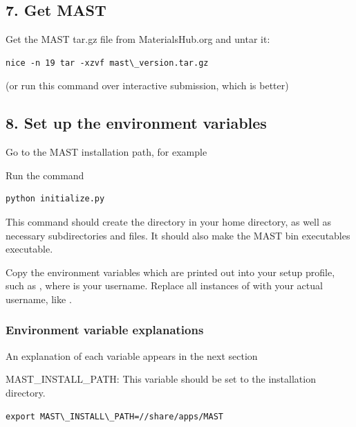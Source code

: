 \documentclass[letterpaper,10pt,english]{sphinxmanual}
\begin{document}
\subsection{7. Get MAST}
\label{1_0_installation:get-mast}
Get the MAST tar.gz file from MaterialsHub.org and untar it:

\begin{Verbatim}[commandchars=\\\{\}]
nice -n 19 tar -xzvf mast\_version.tar.gz
\end{Verbatim}

(or run this command over interactive submission, which is better)


\subsection{8. Set up the environment variables}
\label{1_0_installation:set-up-the-environment-variables}
Go to the MAST installation path, for example 

Run the command

\begin{Verbatim}[commandchars=\\\{\}]
python initialize.py
\end{Verbatim}

This command should create the  directory in your home directory, as well as necessary subdirectories and files.
It should also make the MAST bin executables executable.

Copy the environment variables which are printed out into your setup profile, such as , where  is your username. Replace all instances of  with your actual username, like .


\subsubsection{Environment variable explanations}
\label{1_0_installation:environment-variable-explanations}
An explanation of each variable appears in the next section

MAST\_INSTALL\_PATH: This variable should be set to the installation directory.

\begin{Verbatim}[commandchars=\\\{\}]
export MAST\_INSTALL\_PATH=//share/apps/MAST
\end{Verbatim}
\end{document}
